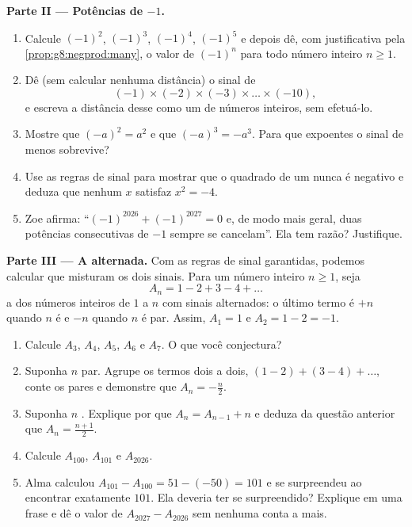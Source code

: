 \begin{problem}
\medskip
\noindent\textbf{Parte II --- Potências de $-1$.}
\begin{enumerate}[resume]
  \item Calcule $(-1)^2$, $(-1)^3$, $(-1)^4$, $(-1)^5$ e depois dê, com
        justificativa pela \cref{prop:g8:negprod:many}, o valor de
        $(-1)^n$ para todo número inteiro $n \geq 1$.
  \item Dê (sem calcular nenhuma distância) o sinal de
        \[
        (-1) \times (-2) \times (-3) \times \dots \times (-10),
        \]
        e escreva a distância desse  como um  de números
        inteiros, sem efetuá-lo.
  \item Mostre que $(-a)^2 = a^2$ e que $(-a)^3 = -a^3$. Para que
        expoentes o sinal de menos sobrevive?
  \item Use as regras de sinal para mostrar que o quadrado de um  nunca é negativo e deduza que nenhum 
        $x$ satisfaz $x^2 = -4$.
  \item Zoe afirma: ``$(-1)^{2026} + (-1)^{2027} = 0$ e, de modo mais
        geral, duas potências consecutivas de $-1$ sempre se
        cancelam''. Ela tem razão? Justifique.
\end{enumerate}

\medskip
\noindent\textbf{Parte III --- A  alternada.}
Com as regras de sinal garantidas, podemos calcular  que misturam
os dois sinais. Para um número inteiro $n \geq 1$, seja
\[
A_n = 1 - 2 + 3 - 4 + \dots
\]
a  dos números inteiros de $1$ a $n$ com sinais alternados: o
último termo é $+n$ quando $n$ é  e $-n$ quando $n$ é par. Assim,
$A_1 = 1$ e $A_2 = 1 - 2 = -1$.
\begin{enumerate}[resume]
  \item Calcule $A_3$, $A_4$, $A_5$, $A_6$ e $A_7$. O que você
        conjectura?
  \item Suponha $n$ par. Agrupe os termos dois a dois,
        $(1 - 2) + (3 - 4) + \dots$, conte os pares e demonstre que
        $A_n = -\frac{n}{2}$.
  \item Suponha $n$ . Explique por que $A_n = A_{n-1} + n$ e
        deduza da questão anterior que $A_n = \frac{n + 1}{2}$.
  \item Calcule $A_{100}$, $A_{101}$ e $A_{2026}$.
  \item Alma calculou $A_{101} - A_{100} = 51 - (-50) = 101$ e se
        surpreendeu ao encontrar exatamente $101$. Ela deveria ter se
        surpreendido? Explique em uma frase e dê o valor de
        $A_{2027} - A_{2026}$ sem nenhuma conta a mais.
\end{enumerate}
\end{problem}
